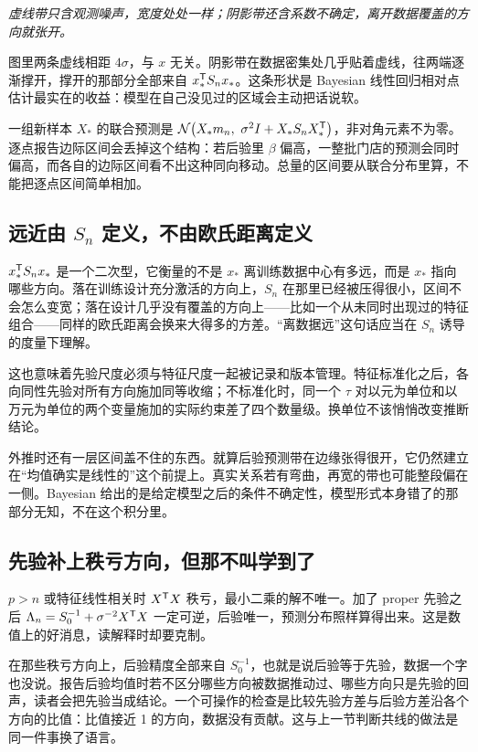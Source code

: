 \emph{虚线带只含观测噪声，宽度处处一样；阴影带还含系数不确定，离开数据覆盖的方向就张开。}

图里两条虚线相距 \(4\sigma\)，与 \(x\) 无关。阴影带在数据密集处几乎贴着虚线，往两端逐渐撑开，撑开的那部分全部来自 \(x_*^{\mathsf{T}}S_nx_*\)。这条形状是 Bayesian 线性回归相对点估计最实在的收益：模型在自己没见过的区域会主动把话说软。

一组新样本 \(X_*\) 的联合预测是 \(\mathcal N\bigl(X_*m_n,\ \sigma^2I+X_*S_nX_*^{\trans}\bigr)\)，非对角元素不为零。逐点报告边际区间会丢掉这个结构：若后验里 \(\beta\) 偏高，一整批门店的预测会同时偏高，而各自的边际区间看不出这种同向移动。总量的区间要从联合分布里算，不能把逐点区间简单相加。

\subsection{远近由 \(S_n\) 定义，不由欧氏距离定义}

\(x_*^{\mathsf{T}}S_nx_*\) 是一个二次型，它衡量的不是 \(x_*\) 离训练数据中心有多远，而是 \(x_*\) 指向哪些方向。落在训练设计充分激活的方向上，\(S_n\) 在那里已经被压得很小，区间不会怎么变宽；落在设计几乎没有覆盖的方向上——比如一个从未同时出现过的特征组合——同样的欧氏距离会换来大得多的方差。``离数据远''这句话应当在 \(S_n\) 诱导的度量下理解。

这也意味着先验尺度必须与特征尺度一起被记录和版本管理。特征标准化之后，各向同性先验对所有方向施加同等收缩；不标准化时，同一个 \(\tau\) 对以元为单位和以万元为单位的两个变量施加的实际约束差了四个数量级。换单位不该悄悄改变推断结论。

外推时还有一层区间盖不住的东西。就算后验预测带在边缘张得很开，它仍然建立在``均值确实是线性的''这个前提上。真实关系若有弯曲，再宽的带也可能整段偏在一侧。Bayesian 给出的是给定模型之后的条件不确定性，模型形式本身错了的那部分无知，不在这个积分里。

\subsection{先验补上秩亏方向，但那不叫学到了}

\(p>n\) 或特征线性相关时 \(X^{\mathsf{T}}X\) 秩亏，最小二乘的解不唯一。加了 proper 先验之后 \(\Lambda_n=S_0^{-1}+\sigma^{-2}X^{\mathsf{T}}X\) 一定可逆，后验唯一，预测分布照样算得出来。这是数值上的好消息，读解释时却要克制。

在那些秩亏方向上，后验精度全部来自 \(S_0^{-1}\)，也就是说后验等于先验，数据一个字也没说。报告后验均值时若不区分哪些方向被数据推动过、哪些方向只是先验的回声，读者会把先验当成结论。一个可操作的检查是比较先验方差与后验方差沿各个方向的比值：比值接近 1 的方向，数据没有贡献。这与上一节判断共线的做法是同一件事换了语言。


